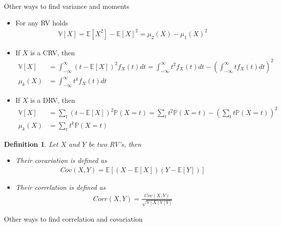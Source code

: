 \documentclass[10pt]{article}
\newtheorem*{definition}{Definition}
\begin{document}
Other ways to find variance and moments

\begin{itemize}
    \item For any RV holds
          \begin{align}
              \mathbb{V}[X]=\mathbb{E}[X^2]-{\mathbb{E}[X]}^2
              =\mu_2(X)-{\mu_1(X)}^2
          \end{align}
    \item If $X$ is a CRV, then
          \begin{align}
              \mathbb{V}[X] &
              = \int_{-\infty}^\infty{(t-\mathbb{E}[X])}^2f_X(t)dt
              =\int_{-\infty}^\infty t^2 f_X(t)dt-
              {\left(\int_{-\infty}^\infty t f_X(t)dt\right)}^2   \\
              \mu_k(X)      & =\int_{-\infty}^\infty t^k f_X(t)dt
          \end{align}
    \item If $X$ is a DRV, then
          \begin{align}
              \mathbb{V}[X] &
              = \sum_t {(t-\mathbb{E}[X])}^2\mathbb{P}(X=t)
              =\sum_t t^2 \mathbb{P}(X=t)-
              {\left(\sum_t t \mathbb{P}(X=t)\right)}^2   \\
              \mu_k(X)      & =\sum_t t^k \mathbb{P}(X=t)
          \end{align}
\end{itemize}

\begin{definition} Let $X$ and $Y$ be two RV's, then
    \begin{itemize}
        \item Their covariation is defined as
              \begin{align}
                  Cov(X,Y)=\mathbb{E}[(X-\mathbb{E}[X])(Y-\mathbb{E}[Y])]
              \end{align}
        \item Their correlation is defined as
              \begin{align}
                  Corr(X,Y)=\frac{Cov(X,Y)}{\sqrt{\mathbb{V}[X]\mathbb{V}[Y]}}
              \end{align}
    \end{itemize}
\end{definition}

Other ways to find correlation and covariation
\end{document}
